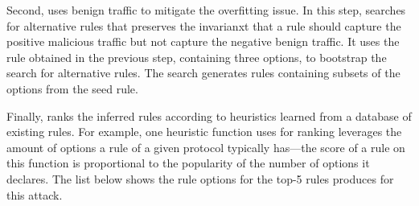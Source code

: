 \documentclass[sigconf,review, anonymous]{acmart}
\begin{document}
Second, \tname{} uses benign traffic to mitigate the overfitting
issue. In this step, \tname{} searches for alternative rules that
preserves the invarianxt that a rule should capture the positive
malicious traffic but not capture the negative benign traffic. It uses
the rule obtained in the previous step, containing three options, to
bootstrap the search for alternative rules. The search generates rules
containing subsets of the options from the seed rule.

 








Finally, \tname{} ranks the inferred rules according to heuristics
learned from a database of existing rules. For example, one heuristic
function \tname{} uses for ranking leverages the amount of options a
rule of a given protocol typically has---the score of a rule on this
function is proportional to the popularity of the number of options it
declares. The list below shows the rule options for the top-5 rules
\tname{} produces for this attack.
\end{document}
